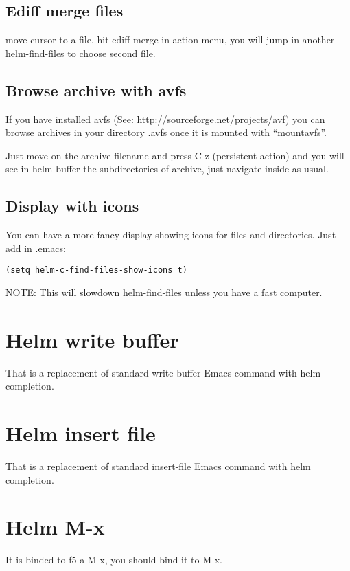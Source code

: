 \documentclass[a4paper,11pt]{article}
\begin{document}
\subsection{Ediff merge files}
\label{sec:ediff-merge-files}
move cursor to a file, hit ediff merge in action menu, you will jump in
another helm-find-files to choose second file.

\subsection{Browse archive with avfs}
\label{sec:browse-archive-with}

If you have installed avfs (See: http://sourceforge.net/projects/avf) you can browse archives
in your directory .avfs once it is mounted with ``mountavfs''.

Just move on the archive filename and press C-z (persistent action) and you will see
in helm buffer the subdirectories of archive, just navigate inside as usual.

\subsection{Display with icons}
\label{sec:display-with-icons}

You can have a more fancy display showing icons for files and directories.
Just add in .emacs:
\begin{verbatim}
(setq helm-c-find-files-show-icons t)
\end{verbatim}
NOTE: This will slowdown helm-find-files unless you have a fast computer.

\section{Helm write buffer}
\label{sec:anyth-write-buff}
That is a replacement of standard write-buffer Emacs command with helm completion.
\section{Helm insert file}
\label{sec:helm-insert-file}
That is a replacement of standard insert-file Emacs command with helm completion.

\section{Helm M-x}
\label{sec:helm-m-x}
It is binded to f5 a M-x, you should bind it to M-x.
\end{document}
